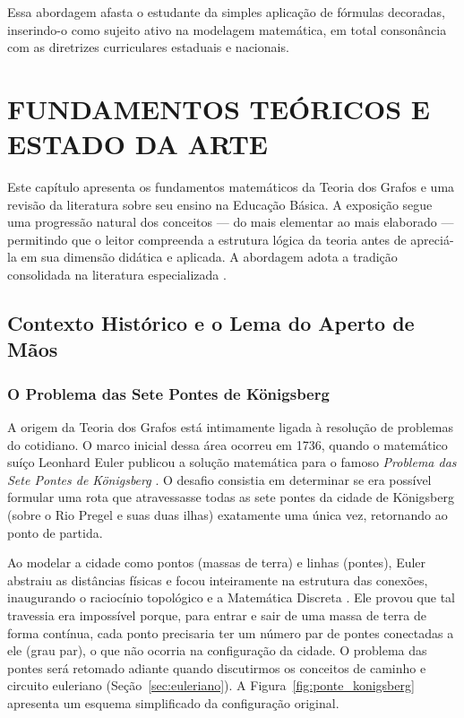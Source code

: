 \documentclass[
  12pt,
  oneside,
  a4paper,
  english,
  brazilian
  ]{abntex2}
\theoremstyle{definition}
\begin{document}
Essa abordagem afasta o estudante da simples aplicação de fórmulas decoradas, inserindo-o como sujeito ativo na modelagem matemática, em total consonância com as diretrizes curriculares estaduais e nacionais.

\chapter{FUNDAMENTOS TEÓRICOS E ESTADO DA ARTE}
\label{cap:fundamentos}

Este capítulo apresenta os fundamentos matemáticos da Teoria dos Grafos e uma
revisão da literatura sobre seu ensino na Educação Básica. A exposição segue uma
progressão natural dos conceitos --- do mais elementar ao mais elaborado ---
permitindo que o leitor compreenda a estrutura lógica da teoria antes de apreciá-
la em sua dimensão didática e aplicada. A abordagem adota a tradição consolidada
na literatura especializada \cite{diestel2017, wilson1996, boaventura2009}.

\section{Contexto Histórico e o Lema do Aperto de Mãos}
\label{sec:historico_lema}

\subsection{O Problema das Sete Pontes de Königsberg}
\label{subsec:sete_pontes}

A origem da Teoria dos Grafos está intimamente ligada à resolução de problemas do cotidiano. O marco inicial dessa área ocorreu em 1736, quando o matemático suíço Leonhard Euler publicou a solução matemática para o famoso \textit{Problema das Sete Pontes de Königsberg} \cite{euler1736}. O desafio consistia em determinar se era possível formular uma rota que atravessasse todas as sete pontes da cidade de Königsberg (sobre o Rio Pregel e suas duas ilhas) exatamente uma única vez, retornando ao ponto de partida.

Ao modelar a cidade como pontos (massas de terra) e linhas (pontes), Euler abstraiu as distâncias físicas e focou inteiramente na estrutura das conexões, inaugurando o raciocínio topológico e a Matemática Discreta \cite{boaventura2009}. Ele provou que tal travessia era impossível porque, para entrar e sair de uma massa de terra de forma contínua, cada ponto precisaria ter um número par de pontes conectadas a ele (grau par), o que não ocorria na configuração da cidade. O problema das pontes será retomado adiante quando discutirmos os conceitos de caminho e circuito euleriano (Seção~\ref{sec:euleriano}). A Figura~\ref{fig:ponte_konigsberg} apresenta um esquema simplificado da configuração original.
\end{document}
